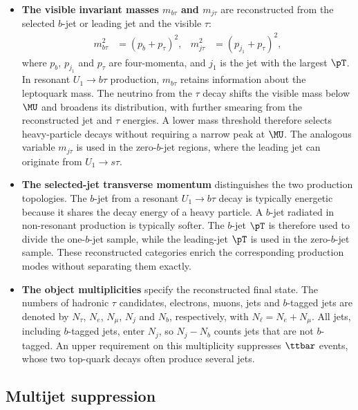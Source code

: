 \begin{itemize}
    \item \textbf{The visible invariant masses $m_{b\tau}$ and $m_{j\tau}$} are reconstructed from the selected $b$-jet or leading jet and the visible $\tau$:
    \begin{align}
        m_{b\tau}^{2} &= (p_b+p_\tau)^2, &
        m_{j\tau}^{2} &= (p_{j_1}+p_\tau)^2,
        \label{eq:ch7_visible_masses}
    \end{align}
    where $p_b$, $p_{j_1}$ and $p_\tau$ are four-momenta, and $j_1$ is the jet with the largest $\pT$.
    In resonant $U_1\to b\tau$ production, $m_{b\tau}$ retains information about the leptoquark mass.
    The neutrino from the $\tau$ decay shifts the visible mass below $\MU$ and broadens its distribution, with further smearing from the reconstructed jet and $\tau$ energies.
    A lower mass threshold therefore selects heavy-particle decays without requiring a narrow peak at $\MU$.
    The analogous variable $m_{j\tau}$ is used in the zero-$b$-jet regions, where the leading jet can originate from $U_1\to s\tau$.

    \item \textbf{The selected-jet transverse momentum} distinguishes the two production topologies.
    The $b$-jet from a resonant $U_1\to b\tau$ decay is typically energetic because it shares the decay energy of a heavy particle.
    A $b$-jet radiated in non-resonant production is typically softer.
    The $b$-jet $\pT$ is therefore used to divide the one-$b$-jet sample, while the leading-jet $\pT$ is used in the zero-$b$-jet sample.
    These reconstructed categories enrich the corresponding production modes without separating them exactly.

    \item \textbf{The object multiplicities} specify the reconstructed final state.
    The numbers of hadronic $\tau$ candidates, electrons, muons, jets and $b$-tagged jets are denoted by $N_\tau$, $N_e$, $N_\mu$, $N_j$ and $N_b$, respectively, with $N_\ell=N_e+N_\mu$.
    All jets, including $b$-tagged jets, enter $N_j$, so $N_j-N_b$ counts jets that are not $b$-tagged.
    An upper requirement on this multiplicity suppresses $\ttbar$ events, whose two top-quark decays often produce several jets.
\end{itemize}

\subsection{Multijet suppression}
\label{subsec:ch7_multijet}

